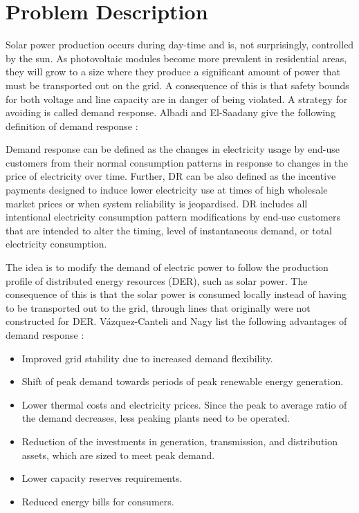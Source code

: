 \documentclass[class=book, crop=false]{standalone}
\begin{document}
\chapter{Problem Description}\label{chap:problem_description}
Solar power production occurs during day-time and is, not surprisingly, controlled by the sun. As photovoltaic modules become more prevalent in residential areas, they will grow to a size where they produce a significant amount of power that must be transported out on the grid. A consequence of this is that safety bounds for both voltage and line capacity are in danger of being violated. A strategy for avoiding is called demand response. Albadi and El-Saadany give the following definition of demand response \cite{demand_response_definition}:

\begin{displayquote}
Demand response can be defined as the changes in electricity usage by end-use customers from their normal consumption patterns in response to changes in the price of electricity over time. Further, DR can be also defined as the incentive payments designed to induce lower electricity use at times of high wholesale market prices or when system reliability is jeopardised. DR includes all intentional electricity consumption pattern modifications by end-use customers that are intended to alter the timing, level of
instantaneous demand, or total electricity consumption.
\end{displayquote}


The idea is to modify the demand of electric power to follow the production profile of distributed energy resources (DER), such as solar power. The consequence of this is that the solar power is consumed locally instead of having to be transported out to the grid, through lines that originally were not constructed for DER. Vázquez-Canteli and Nagy list the following advantages of demand response \cite{active_network_management}:

\begin{itemize}
\item Improved grid stability due to increased demand flexibility. 
\item Shift of peak demand towards periods of peak renewable energy
generation.
\item Lower thermal costs and electricity prices. Since the peak to average
ratio of the demand decreases, less peaking plants need to be operated. 
\item Reduction of the investments in generation, transmission, and distribution assets, which are sized to meet peak demand.
\item Lower capacity reserves requirements.
\item Reduced energy bills for consumers. 
\end{itemize}
\end{document}
